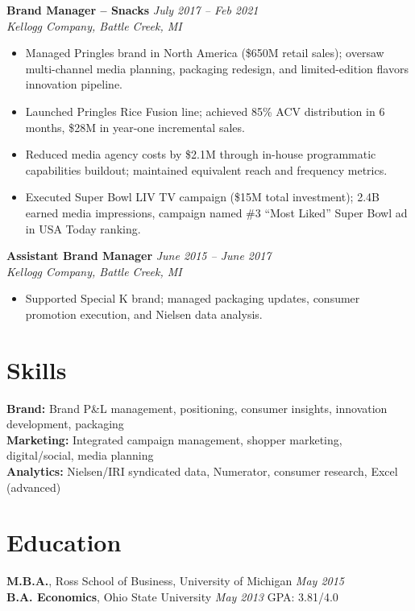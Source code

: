 \documentclass[11pt,a4paper]{article}
\begin{document}
\vspace{4pt}
\noindent\textbf{Brand Manager -- Snacks} \hfill \textit{July 2017 -- Feb 2021}\\
\textit{Kellogg Company, Battle Creek, MI}
\begin{itemize}
  \item Managed Pringles brand in North America (\$650M retail sales); oversaw multi-channel media planning, packaging redesign, and limited-edition flavors innovation pipeline.
  \item Launched Pringles Rice Fusion line; achieved 85\% ACV distribution in 6 months, \$28M in year-one incremental sales.
  \item Reduced media agency costs by \$2.1M through in-house programmatic capabilities buildout; maintained equivalent reach and frequency metrics.
  \item Executed Super Bowl LIV TV campaign (\$15M total investment); 2.4B earned media impressions, campaign named \#3 ``Most Liked'' Super Bowl ad in USA Today ranking.
\end{itemize}

\vspace{4pt}
\noindent\textbf{Assistant Brand Manager} \hfill \textit{June 2015 -- June 2017}\\
\textit{Kellogg Company, Battle Creek, MI}
\begin{itemize}
  \item Supported Special K brand; managed packaging updates, consumer promotion execution, and Nielsen data analysis.
\end{itemize}

\section{Skills}
\textbf{Brand:} Brand P\&L management, positioning, consumer insights, innovation development, packaging\\
\textbf{Marketing:} Integrated campaign management, shopper marketing, digital/social, media planning\\
\textbf{Analytics:} Nielsen/IRI syndicated data, Numerator, consumer research, Excel (advanced)

\section{Education}
\textbf{M.B.A.}, Ross School of Business, University of Michigan \hfill \textit{May 2015}\\
\textbf{B.A. Economics}, Ohio State University \hfill \textit{May 2013} \quad GPA: 3.81/4.0
\end{document}
